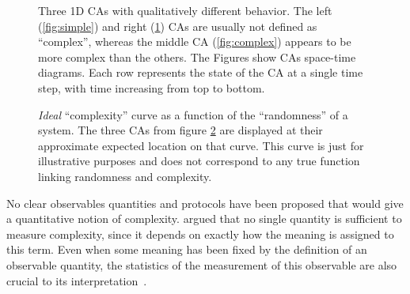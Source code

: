 \begin{figure}[htbp]
\begin{subfigure}[b]{.31\linewidth}
    \caption{}
   \label{fig:random}
  \end{subfigure}
  \caption{Three 1D \aclp{CA} with qualitatively different behavior. The left
    (\ref{fig:simple}) and right (\ref{fig:random}) \acp{CA} are usually not
    defined as ``complex'', whereas the middle \ac{CA} (\ref{fig:complex})
    appears to be more complex than the others. The Figures show \acp{CA} space-time 
    diagrams. Each row represents the state of the \ac{CA} at a single time step, with 
    time increasing from top to bottom.}
  \label{fig:three_eca_complex}
\end{figure}

\begin{figure}[htbp]
  \centering
\caption{\emph{Ideal} ``complexity'' curve as a function of the ``randomness''
  of a system. The three \acp{CA} from figure \ref{fig:three_eca_complex} are
  displayed at their approximate expected location on that curve. This curve is
  just for illustrative purposes and does not correspond to any true function
  linking randomness and complexity.}
\label{fig:complexity_curve}
\end{figure}

No clear observables quantities and protocols have been proposed that would give a
quantitative notion of complexity.
\textcite{grassbergerProblemsQuantifyingSelfgenerated1989} argued that no single
quantity is sufficient to measure complexity, since it depends on exactly how the
meaning is assigned to this term. Even when some meaning has been fixed by the
definition of an observable quantity, the statistics of the measurement of this
observable are also crucial to its
interpretation~\parencite{gutowitzCellularAutomataSciences1995}.

